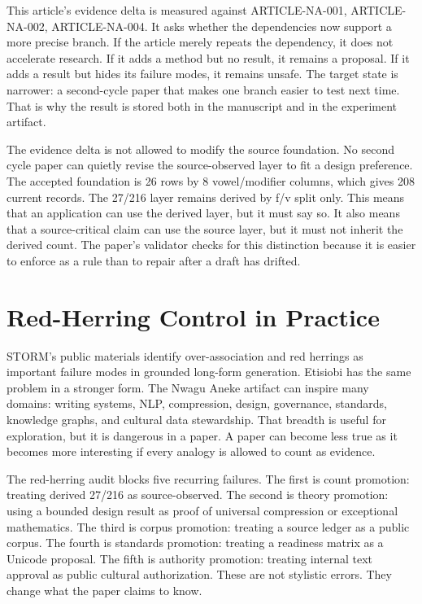\documentclass[sigconf,nonacm]{acmart}
\begin{document}
This article's evidence delta is measured against ARTICLE-NA-001, ARTICLE-NA-002, ARTICLE-NA-004. It asks whether the
dependencies now support a more precise branch. If the article merely repeats
the dependency, it does not accelerate research. If it adds a method but no
result, it remains a proposal. If it adds a result but hides its failure modes,
it remains unsafe. The target state is narrower: a second-cycle paper that makes
one branch easier to test next time. That is why the result is stored both in
the manuscript and in the experiment artifact.

The evidence delta is not allowed to modify the source foundation. No second
cycle paper can quietly revise the source-observed layer to fit a design
preference. The accepted foundation is 26 rows by 8 vowel/modifier columns,
which gives 208 current records. The 27/216 layer remains derived by f/v split
only. This means that an application can use the derived layer, but it must say
so. It also means that a source-critical claim can use the source layer, but it
must not inherit the derived count. The paper's validator checks for this
distinction because it is easier to enforce as a rule than to repair after a
draft has drifted.

\section{Red-Herring Control in Practice}
STORM's public materials identify over-association and red herrings as important
failure modes in grounded long-form generation. Etisiobi has the same problem in
a stronger form. The Nwagu Aneke artifact can inspire many domains: writing
systems, NLP, compression, design, governance, standards, knowledge graphs, and
cultural data stewardship. That breadth is useful for exploration, but it is
dangerous in a paper. A paper can become less true as it becomes more
interesting if every analogy is allowed to count as evidence.

The red-herring audit blocks five recurring failures. The first is count
promotion: treating derived 27/216 as source-observed. The second is theory
promotion: using a bounded design result as proof of universal compression or
exceptional mathematics. The third is corpus promotion: treating a source
ledger as a public corpus. The fourth is standards promotion: treating a
readiness matrix as a Unicode proposal. The fifth is authority promotion:
treating internal text approval as public cultural authorization. These are not
stylistic errors. They change what the paper claims to know.
\end{document}
